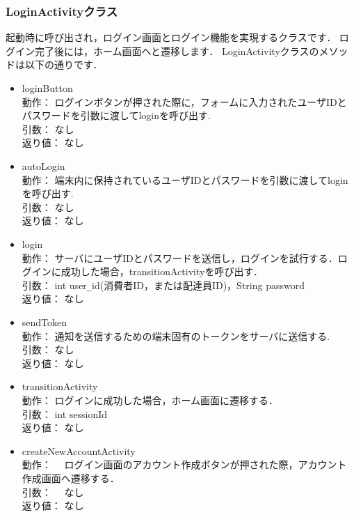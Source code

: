 \documentclass[a4j,titlepage]{jarticle}
\begin{document}
\subsubsection{LoginActivityクラス}
起動時に呼び出され，ログイン画面とログイン機能を実現するクラスです．
ログイン完了後には，ホーム画面へと遷移します．
LoginActivityクラスのメソッドは以下の通りです．
\begin{itemize}
\item loginButton\\
  動作： ログインボタンが押された際に，フォームに入力されたユーザIDとパスワードを引数に渡してloginを呼び出す.\\
  引数： なし\\
  返り値： なし
  
  \item autoLogin\\
  動作： 端末内に保持されているユーザIDとパスワードを引数に渡してloginを呼び出す.\\
  引数： なし\\
  返り値： なし

\item login\\
  動作： サーバにユーザIDとパスワードを送信し，ログインを試行する．ログインに成功した場合，transitionActivityを呼び出す．\\
  引数： int user\verb|_|id(消費者ID，または配達員ID)，String password\\
  返り値： なし

 \item sendToken\\
  動作： 通知を送信するための端末固有のトークンをサーバに送信する.\\
  引数： なし\\
  返り値： なし

\item transitionActivity\\
  動作： ログインに成功した場合，ホーム画面に遷移する．\\
  引数： int sessionId\\
  返り値： なし

  \item createNewAccountActivity\\
  動作： 　ログイン画面のアカウント作成ボタンが押された際，アカウント作成画面へ遷移する．\\
  引数： 　なし\\
  返り値： なし
\end{itemize}
\end{document}
